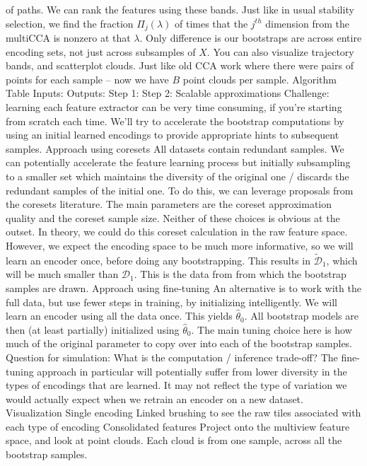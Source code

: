 \documentclass[11pt]{article}
\begin{document}
\begin{outline}
      of paths.
      \4 We can rank the features using these bands. Just like in usual
      stability selection, we find the fraction $\Pi_{j}\left(\lambda\right)$ of
      times that the $j^{th}$ dimension from the multiCCA is nonzero at that
      $\lambda$. Only difference is our bootstraps are across entire encoding
      sets, not just across subsamples of $X$.
      \4 You can also visualize trajectory bands, and scatterplot clouds. Just
      like old CCA work where there were pairs of points for each sample -- now
      we have $B$ point clouds per sample.
\1 Algorithm Table
  \2 Inputs:
  \2 Outputs:
  \2 Step 1:
  \2 Step 2:
\1 Scalable approximations
  \2 Challenge: learning each feature extractor can be very time consuming, if
  you're starting from scratch each time. We'll try to accelerate the bootstrap
  computations by using an initial learned encodings to provide appropriate
  hints to subsequent samples.
  \2 Approach using coresets
    \3 All datasets contain redundant samples. We can potentially accelerate the
    feature learning process but initially subsampling to a smaller set which
    maintains the diversity of the original one / discards the redundant samples
    of the initial one.
    \3 To do this, we can leverage proposals from the coresets literature. The
    main parameters are the coreset approximation quality and the coreset sample
    size. Neither of these choices is obvious at the outset.
    \3 In theory, we could do this coreset calculation in the raw feature space.
    However, we expect the encoding space to be much more informative, so we
    will learn an encoder once, before doing any bootstrapping.
      \4 This results in $\tilde{\mathcal{D}}_{1}$, which will be much smaller
      than $\mathcal{D}_{1}$.
      \4 This is the data from from which the bootstrap samples are drawn.
  \2 Approach using fine-tuning
    \3 An alternative is to work with the full data, but use fewer steps in
    training, by initializing intelligently.
    \3 We will learn an encoder using all the data once. This yields
    $\hat{\theta}_{0}$.
    \3 All bootstrap models are then (at least partially) initialized using
    $\hat{\theta}_{0}$.
    \3 The main tuning choice here is how much of the original parameter to copy
    over into each of the bootstrap samples.
  \2 Question for simulation: What is the computation / inference trade-off?
    \3 The fine-tuning approach in particular will potentially suffer from
    lower diversity in the types of encodings that are learned. It may not
    reflect the type of variation we would actually expect when we retrain an
    encoder on a new dataset.
\1 Visualization
  \2 Single encoding
    \3 Linked brushing to see the raw tiles associated with each type of encoding
  \2 Consolidated features
    \3 Project onto the multiview feature space, and look at point clouds. Each
    cloud is from one sample, across all the bootstrap samples.
\end{outline}
\end{document}
